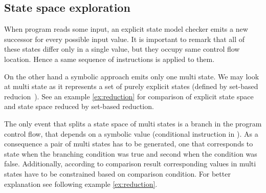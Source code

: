 \subsection{State space exploration}

When program reads some input, an explicit state model checker emits a
new successor for every possible input value. It is important to remark that all of
these states differ only in a single value, but they occupy same control flow
location. Hence a same sequence of instructions is applied to them.


On the other hand a symbolic approach emits only one multi state. We may look at
multi state as it represents a set of purely explicit states (defined by
set-based reducion~\cite{Havel14}). See an example \ref{ex:reduction} for comparison of
explicit state space and state space reduced by set-based reduction.

The only event that splits a state space of multi states is a branch in the
program control flow, that depends on a symbolic value (conditional 
instruction in \LLVM). As a consequence a pair of multi states has to be
generated, one that corresponds to state when the branching condition was true and
second when the condition was false. Additionally, according to comparison result
corresponding values in multi states have to be constrained based on comparison
condition. For better explanation see following example \ref{ex:reduction}.

